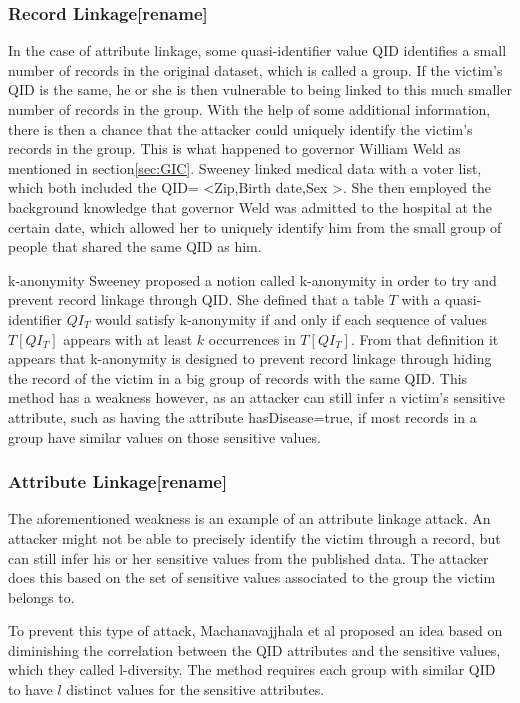 \subsubsection{Record Linkage[rename]}
In the case of attribute linkage, some quasi-identifier value QID identifies a small number of records in the original dataset, which is called a group. If the victim's QID is the same, he or she is then vulnerable to being linked to this much smaller number of records in the group. With the help of some additional information, there is then a chance that the attacker could uniquely identify the victim's records in the group. This is what happened to governor William Weld as mentioned in section\ref{sec:GIC}. Sweeney linked medical data with a voter list, which both included the QID= \textless Zip,Birth date,Sex \textgreater. She then employed the background knowledge that governor Weld was admitted to the hospital at the certain date, which allowed her to uniquely identify him from the small group of people that shared the same QID as him. 

k-anonymity  
Sweeney\cite{sweeney2002k} proposed a notion called k-anonymity in order to try and prevent record linkage through QID. She defined that a table $T$ with a quasi-identifier $QI_T$ would satisfy k-anonymity if and only if each sequence of values $T[QI_T]$ appears with at least $k$ occurrences in $T[QI_T]$. From that definition it appears that k-anonymity is designed to prevent record linkage through hiding the record of the victim in a big group of records with the same QID. This method has a weakness however, as an attacker can still infer a victim's sensitive attribute, such as having the attribute hasDisease=true, if most records in a group have similar values on those sensitive values. 

\subsubsection{Attribute Linkage[rename]}
The aforementioned weakness is an example of an attribute linkage attack. An attacker might not be able to precisely identify the victim through a record, but can still infer his or her sensitive values from the published data. The attacker does this based on the set of sensitive values associated to the group the victim belongs to. 

To prevent this type of attack, Machanavajjhala et al\cite{machanavajjhala2007diversity} proposed an idea based on diminishing the correlation between the QID attributes and the sensitive values, which they called l-diversity. The method requires each group with similar QID to have $l$ distinct values for the sensitive attributes. 


